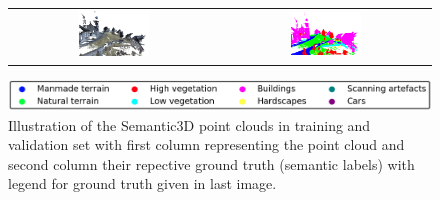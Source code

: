 \begin{figure}
\begin{tabular}{cc}
        \includegraphics[width=0.35\textwidth, height=0.15\textheight]{images/sem3d_data/5.pdf} & 
        \includegraphics[width=0.35\textwidth, height=0.15\textheight]{images/sem3d_data/5_gt.pdf}\\
    \end{tabular}
    \includegraphics[scale=0.45]{images/legend.png}
    \caption{Illustration of the Semantic3D point clouds in training and validation set with first column representing the point cloud 
    and second column their repective ground truth (semantic labels) with legend for ground truth given in last image.}
    \label{fig:sem3d_gt_vis}
\end{figure}

